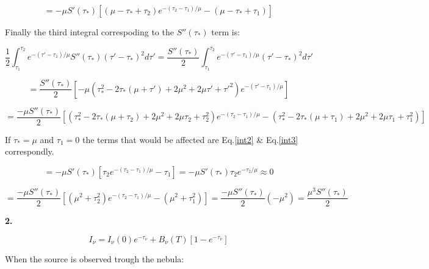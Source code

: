\documentclass[12pt]{article}
\begin{document}
\begin{equation}\label{int2}
= -\mu S'(\tau_*)\left[ (\mu - \tau_* + \tau_2)e^{-(\tau_2 - \tau_1)/\mu} - (\mu - \tau_* + \tau_1) \right]
\end{equation}


Finally the third integral correspoding to the $S''(\tau_*)$ term is:

\begin{equation*}
\dfrac{1}{2}\int_{\tau_1}^{\tau_2}e^{-(\tau ' - \tau_1)/\mu} S''(\tau_*)(\tau ' - \tau_*)^2 d\tau' = \dfrac{S''(\tau_*)}{2} \int_{\tau_1}^{\tau_2}e^{-(\tau ' - \tau_1)/\mu} (\tau ' - \tau_*)^2 d\tau'  
\end{equation*}

\begin{equation*}
 =  \dfrac{S''(\tau_*)}{2} \left[-\mu (\tau_{*}^2 - 2\tau_*(\mu+\tau') + 2\mu^2 + 2\mu \tau' + \tau'^2)e^{-(\tau'-\tau_1)/{\mu}} \right]
\end{equation*}

\begin{equation}\label{int3}
= \dfrac{-\mu S''(\tau_*)}{2} \left[ (\tau_{*}^2 - 2\tau_*(\mu+\tau_2) + 2\mu^2 + 2\mu \tau_2 + \tau_{2}^2)e^{-(\tau_2 -\tau_1)/{\mu}} - (\tau_{*}^2 - 2\tau_*(\mu+\tau_1) + 2\mu^2 + 2\mu \tau_1+ \tau_{1}^2) \right]
\end{equation}

If $\tau_* = \mu$ and $\tau_1 = 0$ the terms that would be affected are Eq.\ref{int2} \& Eq.\ref{int3}
correspondly.

\begin{equation}
 = -\mu S'(\tau_*)\left[ \tau_2 e^{-(\tau_2-\tau_1)/\mu} - \tau_1\right] = -\mu S'(\tau_*) \tau_2 e^{-\tau_2/\mu} \approx 0
\end{equation}

\begin{equation}
= \dfrac{-\mu S''(\tau_*)}{2} \left[ (\mu^2 + \tau_{2}^2)e^{-(\tau_2 -\tau_1)/{\mu}} - (\mu^2 + \tau_{1}^2) \right] = \dfrac{-\mu S''(\tau_*)}{2} ( -\mu^2 ) = \dfrac{\mu^3 S''(\tau_*)}{2}
\end{equation}


\begin{LARGE}
\textbf{2.}
\end{LARGE}


\begin{equation}
I_{\nu} = I_{\nu}(0)e^{-\tau_{\nu}} + B_{\nu}(T)\left[ 1 - e^{-\tau_{\nu}} \right]
\end{equation}

When the source is observed trough the nebula:
\end{document}
